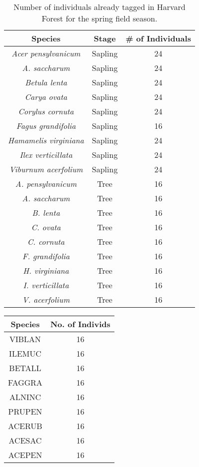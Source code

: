 \documentclass{article}\usepackage[]{graphicx}\usepackage[]{color}
\begin{document}
\begin{table}[H]
\centering
\caption{Number of individuals already tagged in Harvard Forest for the spring field season.}
\begin{tabular}{|c | c | c |}
\hline
\textbf{Species} & \textbf{Stage} & \textbf{\# of Individuals} \\
\hline
\textit{Acer pensylvanicum} & Sapling & 24 \\
\hline 
\textit{A. saccharum} & Sapling & 24 \\
\hline
\textit{Betula lenta} & Sapling & 24 \\
\hline
\textit{Carya ovata} & Sapling & 24 \\
\hline
\textit{Corylus cornuta} & Sapling & 24 \\
\hline
\textit{Fagus grandifolia} & Sapling & 16 \\
\hline
\textit{Hamamelis virginiana} & Sapling & 24 \\
\hline
\textit{Ilex verticillata} & Sapling & 24 \\
\hline
\textit{Viburnum acerfolium} & Sapling & 24 \\
\hline
\textit{A. pensylvanicum} & Tree & 16 \\
\hline
\textit{A. saccharum} & Tree & 16 \\
\hline
\textit{B. lenta} & Tree & 16 \\
\hline
\textit{C. ovata} & Tree & 16 \\
\hline
\textit{C. cornuta} & Tree & 16 \\
\hline
\textit{F. grandifolia} & Tree & 16 \\
\hline
\textit{H. virginiana} & Tree & 16 \\
\hline
\textit{I. verticillata} & Tree & 16 \\
\hline
\textit{V. acerfolium} & Tree & 16 \\
\hline
\end{tabular}
\label{tab:fieldfrz}
\end{table}

\begin{center}
 \label{tab:grant} 
\footnotesize
\begin{tabular}{|c | c |}
\hline
\textbf{Species} & \textbf{No. of Individs} \\
\hline
VIBLAN & 16 \\
\hline
ILEMUC & 16 \\
\hline
BETALL & 16 \\
\hline
FAGGRA & 16 \\
\hline
ALNINC & 16 \\
\hline
PRUPEN & 16 \\
\hline
ACERUB & 16 \\
\hline
ACESAC & 16 \\
\hline
ACEPEN & 16 \\
\hline
\end{tabular}
\end{center}
\end{document}
